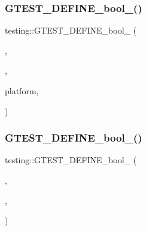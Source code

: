 \mbox{\label{namespacetesting_ad37eab296e354d74a81e2cedc34ac6b8}} 
\subsubsection{\texorpdfstring{GTEST\_DEFINE\_bool\_()}{GTEST\_DEFINE\_bool\_()}\hspace{0.1cm}{\footnotesize\ttfamily [5/11]}}
{\footnotesize\ttfamily testing\+::\+G\+T\+E\+S\+T\+\_\+\+D\+E\+F\+I\+N\+E\+\_\+bool\+\_\+ (\begin{DoxyParamCaption}\item[{install\+\_\+failure\+\_\+signal\+\_\+handler}]{,  }\item[{\mbox{\hyperlink{namespacetesting_1_1internal_a67132cdce23fb71b6c38ee34ef81eb4c}{internal\+::\+Bool\+From\+G\+Test\+Env}}(\char`\"{}install\+\_\+failure\+\_\+signal\+\_\+handler\char`\"{}, false)}]{,  }\item[{\char`\"{}If true and supported on the current}]{platform,  }\item[{\char`\"{} G\+T\+E\+S\+T\+\_\+\+N\+A\+M\+E\+\_\+ \char`\"{} should \char`\"{} \char`\"{}install a signal handler that dumps debugging information when fatal \char`\"{} \char`\"{}signals are raised.\char`\"{}}]{ }\end{DoxyParamCaption})}

\mbox{\label{namespacetesting_a0fa31ecbf33c5e5970cca1d91c050153}} 
\subsubsection{\texorpdfstring{GTEST\_DEFINE\_bool\_()}{GTEST\_DEFINE\_bool\_()}\hspace{0.1cm}{\footnotesize\ttfamily [6/11]}}
{\footnotesize\ttfamily testing\+::\+G\+T\+E\+S\+T\+\_\+\+D\+E\+F\+I\+N\+E\+\_\+bool\+\_\+ (\begin{DoxyParamCaption}\item[{list\+\_\+tests}]{,  }\item[{false}]{,  }\item[{\char`\"{}List all tests without running them.\char`\"{}}]{ }\end{DoxyParamCaption})}

